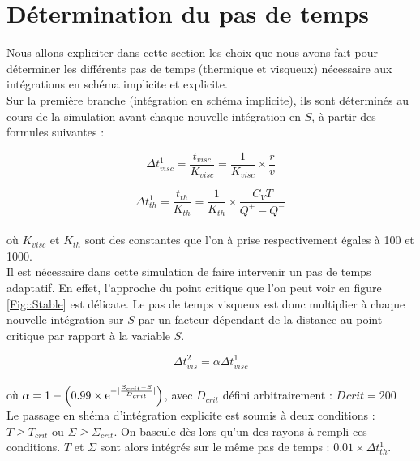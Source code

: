 \section{Détermination du pas de temps\label{sec::pas_de_temps}}
Nous allons expliciter dans cette section les choix que nous avons fait pour déterminer les différents pas de temps 	(thermique et visqueux) nécessaire aux intégrations en schéma implicite et explicite. \\


Sur la première branche (intégration en schéma implicite), ils sont déterminés au cours de la simulation avant chaque nouvelle intégration en $S$, à partir des formules suivantes : 

\begin{equation}
	\Delta t_{visc}^{1} = \frac{t_{visc}}{K_{visc}} = \frac{1}{K_{visc}} \times \frac{r}{v}
\end{equation}

\begin{equation}
	\Delta t_{th}^{1} = \frac{t_{th}}{K_{th}}= \frac{1}{K_{th}} \times \frac{C_{V} T}{Q^{+} - Q^{-}}
\end{equation} \\

où $K_{visc}$ et $K_{th}$ sont des constantes que l'on à prise respectivement égales à 100 et 1000. \\


Il est nécessaire dans cette simulation de faire intervenir un pas de temps adaptatif. En effet, l'approche du point critique que l'on peut voir en figure \ref{Fig::Stable} est délicate. Le pas de temps visqueux est donc multiplier
à chaque nouvelle intégration sur $S$ par un facteur dépendant de la distance au point critique par rapport à la variable $S$. 


\begin{equation}
	\Delta t_{vis}^{2} = \alpha \Delta t_{visc}^{1}
\end{equation} \\

où $\alpha = 1 - \left( 0.99 \times \e^{- \lvert \frac{S_{crit} - S}{D_{crit}} \rvert} \right)$, avec $D_{crit}$ défini arbitrairement : $D_{}crit = 200$ \\

Le passage en shéma d'intégration explicite est soumis à deux conditions : $T \ge T_{crit}$ ou $\Sigma \ge \Sigma_{crit}$. On bascule dès lors qu'un des rayons à rempli ces conditions. $T$ et $\Sigma$ sont alors intégrés sur le même pas de temps : $0.01 \times \Delta t_{th}^{1}$.
